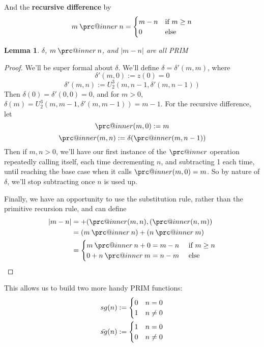 \documentclass{article}
\makeatletter
\newcommand{\prc}{\mathbin{\mathpalette\prc@inner\relax}}
\newcommand{\prc@inner}[2]{%
  \vbox{\offinterlineskip\m@th
    \ialign{%
      ##\cr
      \hidewidth\raisebox{-1.5\height}[0pt][0pt]{$#1.$}\hidewidth\cr
      $#1-$\cr
    }%
  }%
}
\theoremstyle{definition}
\theoremstyle{plain}
\theoremstyle{theorem}
\newtheorem{lemma}{Lemma}[section]
\makeatother
\begin{document}
And the \textbf{recursive difference} by 
\[ m \prc n = \begin{cases}
                            m-n & \textrm{if $m \geq n$} \\
                            0   & \textrm{else}
                        \end{cases}
\]
\begin{lemma}
    $\delta$, $m \prc n$, and $|m-n|$ are all PRIM 
\end{lemma}
\begin{proof}
    We'll be super formal about $\delta$. We'll define $\delta = \delta'(m,m)$, where
    \[ \delta'(m,0) := z(0) = 0 \]
    \[ \delta'(m,n) := U_2^3(m,n-1,\delta'(m,n-1)) \]
    Then $\delta(0) = \delta'(0,0) = 0$, and for $m>0$, $\delta(m) = U_2^3(m,m-1,\delta'(m,m-1)) = m-1$. For the recursive difference, let 
    \[ \prc(m,0) := m \]
    \[ \prc(m,n) := \delta(\prc(m,n-1)) \]
    Then if $m,n >0$, we'll have our first instance of the $\prc$ operation repeatedly calling itself, each time decrementing $n$, and subtracting 1 each time, until reaching the base case when it calls $\prc(m,0)=m$. So by nature of $\delta$, we'll stop subtracting once $n$ is used up. 
    \par Finally, we have an opportunity to use the substitution rule, rather than the primitive recursion rule, and can define 
    \begin{align}
        |m-n| &= +(\prc(m,n),(\prc(n,m))\\
              &= (m\prc n) + (n\prc m) \\
              &= \begin{cases}
                    m\prc n + 0 = m-n & \textrm{ if $m \geq n$} \\
                    0+n\prc m = n-m &\textrm{ else}
                \end{cases}
    \end{align}
\end{proof}
This allows us to build two more handy PRIM functions:
\begin{align}
    sg(n) := \begin{cases}
                0 & n=0 \\
                1 & n \neq 0 
              \end{cases} \\
    \Bar{sg}(n) := \begin{cases}
                        1 & n=0 \\
                        0 & n \neq 0
                    \end{cases}
\end{align}
\end{document}
